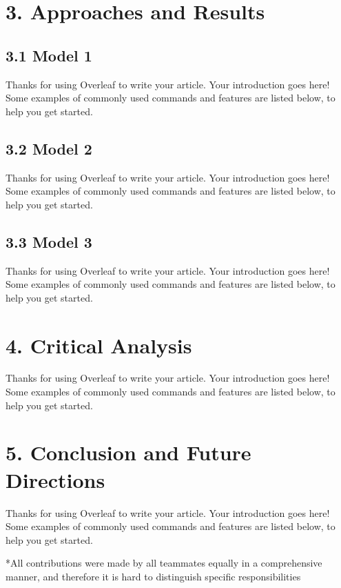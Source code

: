 \documentclass[fleqn,11pt]{olplainarticle}
\begin{document}
\section*{3. Approaches and Results}

\subsection*{3.1 Model 1}
Thanks for using Overleaf to write your article. Your introduction goes here! Some examples of commonly used commands and features are listed below, to help you get started.

\subsection*{3.2 Model 2}
Thanks for using Overleaf to write your article. Your introduction goes here! Some examples of commonly used commands and features are listed below, to help you get started.

\subsection*{3.3 Model 3}
Thanks for using Overleaf to write your article. Your introduction goes here! Some examples of commonly used commands and features are listed below, to help you get started.

\section*{4. Critical Analysis}
Thanks for using Overleaf to write your article. Your introduction goes here! Some examples of commonly used commands and features are listed below, to help you get started.

\section*{5. Conclusion and Future Directions}
Thanks for using Overleaf to write your article. Your introduction goes here! Some examples of commonly used commands and features are listed below, to help you get started.



\small{*All contributions were made by all teammates equally in a comprehensive manner, and therefore it is hard to distinguish specific responsibilities}
\end{document}
